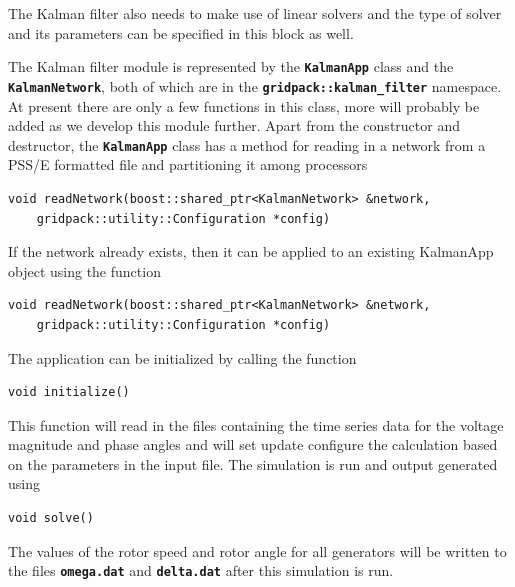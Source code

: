 The Kalman filter also needs to make use of linear solvers and the type of solver and its parameters can be specified in this block as well.

The Kalman filter module is represented by the \texttt{\textbf{KalmanApp}} class and the \texttt{\textbf{KalmanNetwork}}, both of which are in the \texttt{\textbf{gridpack::kalman\_filter}} namespace. At present there are only a few functions in this class, more will probably be added as we develop this module further. Apart from the constructor and destructor, the \texttt{\textbf{KalmanApp}} class has a method for reading in a network from a PSS/E formatted file and partitioning it among processors

{
\color{red}
\begin{Verbatim}[fontseries=b]
void readNetwork(boost::shared_ptr<KalmanNetwork> &network,
    gridpack::utility::Configuration *config)
\end{Verbatim}
}

If the network already exists, then it can be applied to an existing KalmanApp object using the function

{
\color{red}
\begin{Verbatim}[fontseries=b]
void readNetwork(boost::shared_ptr<KalmanNetwork> &network,
    gridpack::utility::Configuration *config)
\end{Verbatim}
}

The application can be initialized by calling the function

{
\color{red}
\begin{Verbatim}[fontseries=b]
void initialize()
\end{Verbatim}
}

This function will read in the files containing the time series data for the voltage magnitude and phase angles and will set update configure the calculation based on the parameters in the input file. The simulation is run and output generated using
{
\color{red}
\begin{Verbatim}[fontseries=b]
void solve()
\end{Verbatim}
}

The values of the rotor speed and rotor angle for all generators will be written to the files \texttt{\textbf{omega.dat}} and \texttt{\textbf{delta.dat}} after this simulation is run.
\newline
\hyperlink{topDoc}{\color{blue}{Top}}
